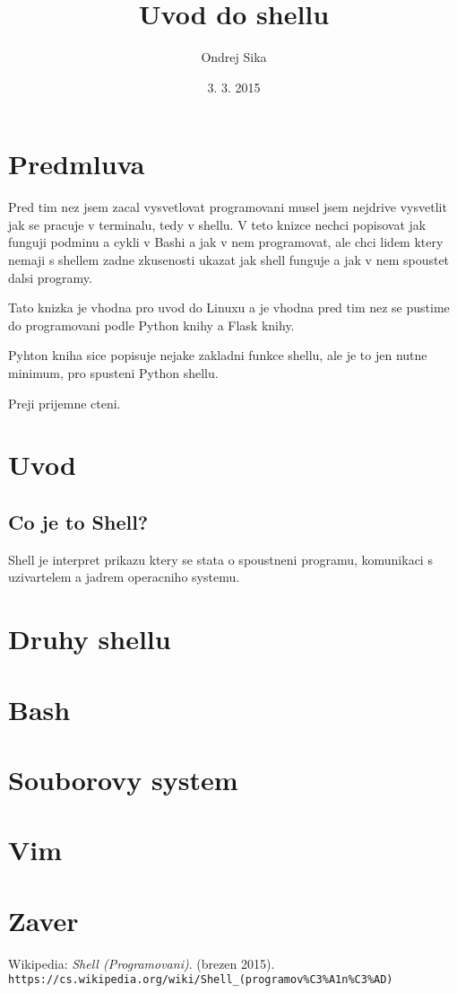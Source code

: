\documentclass[12pt,a5paper]{article}
\title{Uvod do shellu}
\author{Ondrej Sika}
\date{3. 3. 2015}
\begin{document}


\section{Predmluva}

Pred tim nez jsem zacal vysvetlovat programovani musel jsem nejdrive vysvetlit jak se pracuje v terminalu, tedy v shellu. V teto knizce nechci popisovat jak funguji podminu a cykli v Bashi a jak v nem programovat, ale chci lidem ktery nemaji s shellem zadne zkusenosti ukazat jak shell funguje a jak v nem spoustet dalsi programy.

Tato knizka je vhodna pro uvod do Linuxu a je vhodna pred tim nez se pustime do programovani podle Python knihy a Flask knihy.

Pyhton kniha sice popisuje nejake zakladni funkce shellu, ale je to jen nutne minimum, pro spusteni Python shellu.

Preji prijemne cteni.


\section{Uvod}
\subsection{Co je to Shell?}

Shell je interpret prikazu ktery se stata o spoustneni programu, komunikaci s uzivartelem a jadrem operacniho systemu. \cite{wiki-shell}

\section{Druhy shellu}
\section{Bash}
\section{Souborovy system}
\section{Vim}
\section{Zaver}

\begin{thebibliography}{10}
   Wikipedia:
    \emph{Shell (Programovani)}. (brezen 2015).\\
    \lstinline|https://cs.wikipedia.org/wiki/Shell_(programov%C3%A1n%C3%AD)|
\end{thebibliography}
\end{document}

